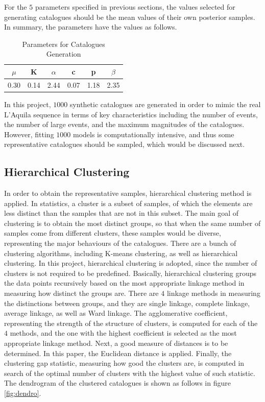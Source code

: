 \documentclass[11pt,twoside]{article}
\numberwithin{Theorem}{section}
\numberwithin{Definition}{section}
\numberwithin{Lemma}{section}
\numberwithin{Algorithm}{section}
\numberwithin{equation}{section}
\begin{document}
For the $5$ parameters specified in previous sections, the values selected for generating catalogues should be the mean values of their own posterior samples. In summary, the parameters have the values as follows.
\begin{table}[h]
\centering
\begin{tabular}{|c|c|c|c|c|c|}

\hline
$\mu$   & K    & $\alpha$  & c    & p    & $\beta$ \\ \hline
0.30 & 0.14 & 2.44 & 0.07 & 1.18 & 2.35 \\ \hline

\end{tabular}
\caption{Parameters for Catalogues Generation}
\label{tab:parcat}

\end{table}

In this project, $1000$ synthetic catalogues are generated in order to mimic the real L'Aquila sequence in terms of key characteristics including the number of events, the number of large events, and the maximum magnitudes of the catalogues. However, fitting $1000$ models is computationally intensive, and thus some representative catalogues should be sampled, which would be discussed next.

\subsection{Hierarchical Clustering}
In order to obtain the representative samples, hierarchical clustering method is applied. In statistics, a cluster is a subset of samples, of which the elements are less distinct than the samples that are not in this subset. The main goal of clustering is to obtain the most distinct groups, so that when the same number of samples come from different clusters, these samples would be diverse, representing the major behaviours of the catalogues. There are a bunch of clustering algorithms, including K-means clustering, as well as hierarchical clustering. In this project, hierarchical clustering is adopted, since the number of clusters is not required to be predefined. Basically, hierarchical clustering groups the data points recursively based on the most appropriate linkage method in measuring how distinct the groups are. There are $4$ linkage methods in measuring the distinctions between groups, and they are single linkage, complete linkage, average linkage, as well as Ward linkage. The agglomerative coefficient, representing the strength of the structure of clusters, is computed for each of the $4$ methods, and the one with the highest coefficient is selected as the most appropriate linkage method. Next, a good measure of distances is to be determined. In this paper, the Euclidean distance is applied. Finally, the clustering gap statistic, measuring how good the clusters are, is computed in search of the optimal number of clusters with the highest value of such statistic. The dendrogram of the clustered catalogues is shown as follows in figure \ref{fig:dendro}.
\end{document}
